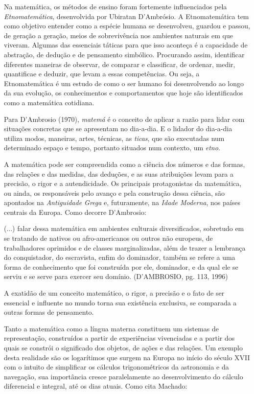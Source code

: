 \documentclass[brasil]{abnt}
\begin{document}
    Na matemática, os métodos de ensino foram fortemente influenciados pela \textit{Etnomatemática}, desenvolvida 
    por Ubiratan D’Ambrósio. A Etnomatemática tem como objetivo entender como a espécie humana se desenvolveu, guardou e passou, de geração a geração, meios de sobrevivência nos ambientes naturais em que viveram. 
	Algumas das essenciais táticas para que isso aconteça é a capacidade de abstração, de dedução e de pensamento simbólico. Procurando assim, identificar diferentes maneiras de observar,
	de comparar e classificar, de ordenar, medir, quantificae e deduzir, que levam a essas competências. Ou seja, a Etnomatemática é um estudo de como o ser humano foi desenvolvendo ao longo da sua
	evolução, os conhecimentos e comportamentos que hoje são identificados como a matemática cotidiana.
			
	Para D'Ambrosio (1970), \textit{matemá} é o conceito de aplicar a razão para lidar com situações concretas que se apresentam no dia-a-dia. E o lidador do dia-a-dia utiliza modos, maneiras, 
	artes, técnicas, as \textit{ticas}, que são executadas num determinado espaço e tempo, portanto situados num contexto, um \textit{etno}. 
			
	A matemática pode ser compreendida como a ciência dos números e das formas, das relações e das medidas, das deduções, e as suas atribuições levam para a precisão, o rigor e a autendicidade.
	Os principais protagonistas da matemática, ou ainda, os responsáveis pelo avanço e pela construção dessa ciência, são apontados na \textit{Antiguidade Grega} e, futuramente, na \textit{Idade Moderna}, 
	nos países centrais da Europa. Como decorre D'Ambrosio:
			
	\begin{citacao}(...) falar dessa matemática em ambientes culturais diversificados, sobretudo em se tratando de nativos ou afro-americanos ou outros não europeus, de trabalhadores oprimidos e de classes 
		marginalizadas, além de trazer a lembrança do conquistador, do escravista, enfim do dominador, também se refere a uma forma de conhecimento que foi construída por ele, dominador, e da qual ele se serviu
		e se serve para exercer seu domínio. (D'AMBROSIO, pg. 113, 1996)
	\end{citacao}
			  
	A exatidão de um conceito matemático, o rigor, a precisão e o fato de ser essencial e influente no mundo torna sua existência exclusiva, se comparada a outras formas de pensamento. 	
	    
    Tanto a matemática como a língua materna constituem um sistemas de representação, construídos a partir de experiências vivenciadas e a partir dos quais se 
    constrói o significado  dos objetos, de ações e das relações. Um exemplo desta realidade são os logarítimos que surgem na Europa no início do século XVII com 
    o intuito de simplificar os cálculos trigonométricos da astronomia e da navegação, sua importância cresce paralelamente ao desenvolvimento do cálculo 
    diferencial e integral, até os dias atuais. Como cita Machado:
    
\end{document}
